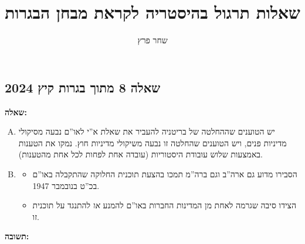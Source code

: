 \documentclass[]{../../../../tex/classes/styledArticle}
\author{שחר פרץ}
\title{שאלות תרגול בהיסטריה לקראת מבחן הבגרות}
\begin{document}
	\maketitle
	\subsection*{שאלה 8 מתוך בגרות קיץ 2024}
	\textbf{שאלה: }
	
	\begin{enumerate}[A.]
		\item יש הטוענים שההחלטה של בריטניה להעביר את שאלת א''י לאו''ם נבעה מסיקולי מדיניות פנים, ויש הטוענים שהחלטה זו נבעה משיקולי מדיניות חוץ. נמקו את הטענות באמצעות שלוש עובודת היסטוריות (עובדה אחת לפחות לכל אחת מהטענות). 
		\item \begin{itemize}
			\item הסבירו מדוע גם ארה''ב וגם ברה''מ תמכו בהצעת תוכנית החלוקה שהתקבלה באו''ם בכ''ט בנובמבר 1947. 
			\item הצידו סיבה שגרמה לאחת מן המדינות החברות באו''ם להמנע \textit{או} להתנגד על תוכנית זו. 
		\end{itemize}
	\end{enumerate}
	
	\textbf{תשובה: }
	
\end{document}
